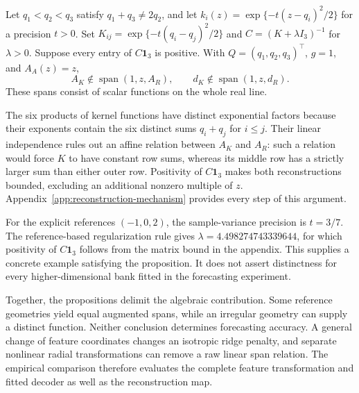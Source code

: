 \begin{proposition}
\label{prop:mechanism-distinct}
Let $q_1<q_2<q_3$ satisfy $q_1+q_3\ne2q_2$, and let
$k_i(z)=\exp\{-t(z-q_i)^2/2\}$ for a precision $t>0$.
Set $K_{ij}=\exp\{-t(q_i-q_j)^2/2\}$ and
$C=(K+\lambda I_3)^{-1}$ for $\lambda>0$.
Suppose every entry of $C\mathbf1_3$ is positive. With
$Q=(q_1,q_2,q_3)^\top$, $g=1$, and $A_A(z)=z$,
\[
 A_K\notin\operatorname{span}(1,z,A_R),\qquad
 d_K\notin\operatorname{span}(1,z,d_R).
\]
These spans consist of scalar functions on the whole real line.
\end{proposition}

The six products of kernel functions have distinct exponential factors
because their exponents contain the six distinct sums $q_i+q_j$ for
$i\le j$. Their linear independence rules out an affine relation
between $A_K$ and $A_R$: such a relation would force $K$ to have
constant row sums, whereas its middle row has a strictly larger sum
than either outer row. Positivity of $C\mathbf1_3$ makes both
reconstructions bounded, excluding an additional nonzero multiple of
$z$. Appendix~\ref{app:reconstruction-mechanism} provides every step
of this argument.

For the explicit references $(-1,0,2)$, the sample-variance precision is
$t=3/7$. The reference-based regularization rule gives
$\lambda=4.498274743339644$, for which positivity of $C\mathbf1_3$
follows from the matrix bound in the appendix. This supplies a concrete
example satisfying the proposition. It does not assert distinctness
for every higher-dimensional bank fitted in the forecasting experiment.

Together, the propositions delimit the algebraic contribution. Some
reference geometries yield equal augmented spans, while an irregular
geometry can supply a distinct function. Neither conclusion determines
forecasting accuracy. A general change of feature coordinates changes
an isotropic ridge penalty, and separate nonlinear radial transformations
can remove a raw linear span relation. The empirical comparison
therefore evaluates the complete feature transformation and fitted
decoder as well as the reconstruction map.


